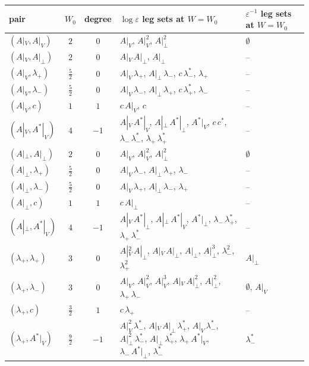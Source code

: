 \documentclass[11pt]{article}
\numberwithin{equation}{section}
\theoremstyle{plain}
\theoremstyle{definition}
\begin{document}
\begin{table}[h]
\centering\scriptsize
\begin{tabular}{l|c|c|l|l}
pair & $W_0$ & degree & $\log\varepsilon$ leg sets at $W=W_0$ & $\varepsilon^{-1}$ leg sets at $W=W_0$\\\hline
$(A|_V,A|_V)$ & $2$ & $0$ & $A|_V$, $A|_V^{2}$, $A|_\perp^{2}$ & $\emptyset$\\
$(A|_V,A|_\perp)$ & $2$ & $0$ & $A|_V\,A|_\perp$, $A|_\perp$ & --\\
$(A|_V,\lambda_+)$ & $\tfrac{5}{2}$ & $0$ & $A|_V\,\lambda_+$, $A|_\perp\,\lambda_-$, $c\,\lambda^*_-$, $\lambda_+$ & --\\
$(A|_V,\lambda_-)$ & $\tfrac{5}{2}$ & $0$ & $A|_V\,\lambda_-$, $A|_\perp\,\lambda_+$, $c\,\lambda^*_+$, $\lambda_-$ & --\\
$(A|_V,c)$ & $1$ & $1$ & $c\,A|_V$, $c$ & --\\
$(A|_V,A^*|_V)$ & $4$ & $-1$ & $A|_V\,A^*|_V$, $A|_\perp\,A^*|_\perp$, $A^*|_V$, $c\,c^*$, $\lambda_-\,\lambda^*_-$, $\lambda_+\,\lambda^*_+$ & --\\
$(A|_\perp,A|_\perp)$ & $2$ & $0$ & $A|_V$, $A|_V^{2}$, $A|_\perp^{2}$ & $\emptyset$\\
$(A|_\perp,\lambda_+)$ & $\tfrac{5}{2}$ & $0$ & $A|_V\,\lambda_-$, $A|_\perp\,\lambda_+$, $\lambda_-$ & --\\
$(A|_\perp,\lambda_-)$ & $\tfrac{5}{2}$ & $0$ & $A|_V\,\lambda_+$, $A|_\perp\,\lambda_-$, $\lambda_+$ & --\\
$(A|_\perp,c)$ & $1$ & $1$ & $c\,A|_\perp$ & --\\
$(A|_\perp,A^*|_V)$ & $4$ & $-1$ & $A|_V\,A^*|_\perp$, $A|_\perp\,A^*|_V$, $A^*|_\perp$, $\lambda_-\,\lambda^*_+$, $\lambda_+\,\lambda^*_-$ & --\\
$(\lambda_+,\lambda_+)$ & $3$ & $0$ & $A|_V^{2}\,A|_\perp$, $A|_V\,A|_\perp$, $A|_\perp$, $A|_\perp^{3}$, $\lambda_-^{2}$, $\lambda_+^{2}$ & $A|_\perp$\\
$(\lambda_+,\lambda_-)$ & $3$ & $0$ & $A|_V$, $A|_V^{2}$, $A|_V^{3}$, $A|_V\,A|_\perp^{2}$, $A|_\perp^{2}$, $\lambda_+\,\lambda_-$ & $\emptyset$, $A|_V$\\
$(\lambda_+,c)$ & $\tfrac{3}{2}$ & $1$ & $c\,\lambda_+$ & --\\
$(\lambda_+,A^*|_V)$ & $\tfrac{9}{2}$ & $-1$ & $A|_V^{2}\,\lambda^*_-$, $A|_V\,A|_\perp\,\lambda^*_+$, $A|_V\,\lambda^*_-$, $A|_\perp^{2}\,\lambda^*_-$, $A|_\perp\,\lambda^*_+$, $\lambda_+\,A^*|_V$, $\lambda_-\,A^*|_\perp$, $\lambda^*_-$ & $\lambda^*_-$\\

\end{tabular}
\end{table}
\end{document}
